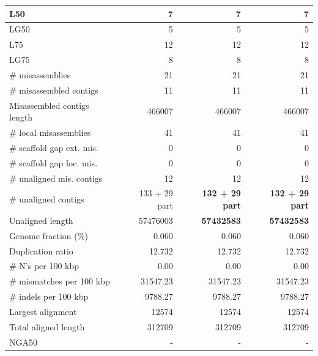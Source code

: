 \documentclass[12pt,a4paper]{article}
\begin{document}
\begin{table}[ht]
\begin{center}
\begin{tabular}{|l*{3}{|r}|}
L50 & 7 & 7 & 7 \\ \hline
LG50 & 5 & 5 & 5 \\ \hline
L75 & 12 & 12 & 12 \\ \hline
LG75 & 8 & 8 & 8 \\ \hline
\# misassemblies & 21 & 21 & 21 \\ \hline
\# misassembled contigs & 11 & 11 & 11 \\ \hline
Misassembled contigs length & 466007 & 466007 & 466007 \\ \hline
\# local misassemblies & 41 & 41 & 41 \\ \hline
\# scaffold gap ext. mis. & 0 & 0 & 0 \\ \hline
\# scaffold gap loc. mis. & 0 & 0 & 0 \\ \hline
\# unaligned mis. contigs & 12 & 12 & 12 \\ \hline
\# unaligned contigs & 133 + 29 part & {\bf 132 + 29 part} & {\bf 132 + 29 part} \\ \hline
Unaligned length & 57476003 & {\bf 57432583} & {\bf 57432583} \\ \hline
Genome fraction (\%) & 0.060 & 0.060 & 0.060 \\ \hline
Duplication ratio & 12.732 & 12.732 & 12.732 \\ \hline
\# N's per 100 kbp & 0.00 & 0.00 & 0.00 \\ \hline
\# mismatches per 100 kbp & 31547.23 & 31547.23 & 31547.23 \\ \hline
\# indels per 100 kbp & 9788.27 & 9788.27 & 9788.27 \\ \hline
Largest alignment & 12574 & 12574 & 12574 \\ \hline
Total aligned length & 312709 & 312709 & 312709 \\ \hline
NGA50 & - & - & - \\ \hline
\end{tabular}
\end{center}
\end{table}
\end{document}
